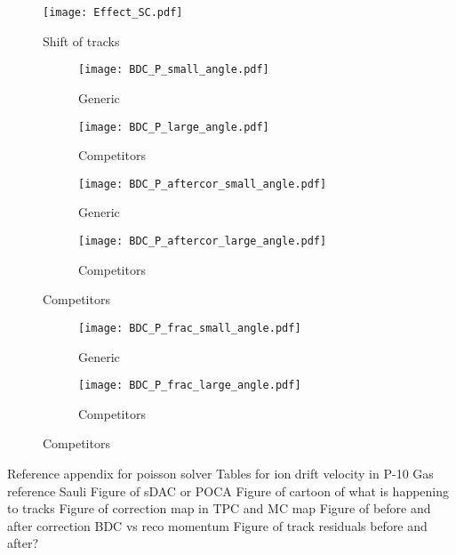 \begin{figure}[H]
\texttt{[image: Effect\_SC.pdf]}
\caption{Shift of tracks}
\label{fig:sc_shift}
\end{figure}


\begin{figure}[!htb]
    \centering
    \begin{subfigure}[t]{0.45\textwidth}
        \centering
        \texttt{[image: BDC\_P\_small\_angle.pdf]} 
        \caption{Generic} \label{fig:mom_S_before}
    \end{subfigure}
    \hfill
    \begin{subfigure}[t]{0.45\textwidth}
        \centering
        \texttt{[image: BDC\_P\_large\_angle.pdf]} 
        \caption{Competitors} \label{fig:mom_L_before}
    \end{subfigure}
    
    \begin{subfigure}[t]{0.45\textwidth}
        \centering
        \texttt{[image: BDC\_P\_aftercor\_small\_angle.pdf]} 
        \caption{Generic} \label{fig:mom_S_after}
    \end{subfigure}
    \hfill
    \begin{subfigure}[t]{0.45\textwidth}
        \centering
        \texttt{[image: BDC\_P\_aftercor\_large\_angle.pdf]} 
        \caption{Competitors} \label{fig:mom_L_after}
    \end{subfigure}
\label{fig:mom_sc}
\end{figure}



\begin{figure}[!htb]
    \centering
    \begin{subfigure}[t]{0.49\textwidth}
        \centering
        \texttt{[image: BDC\_P\_frac\_small\_angle.pdf]} 
        \caption{Generic} \label{fig:mom_S_1D}
    \end{subfigure}
    \hfill
    \begin{subfigure}[t]{0.49\textwidth}
        \centering
        \texttt{[image: BDC\_P\_frac\_large\_angle.pdf]} 
        \caption{Competitors} \label{fig:mom_L_1D}
    \end{subfigure}
    
\label{fig:mom_1D}
\end{figure}



Reference appendix for poisson solver 
Tables for ion drift velocity in P-10 Gas reference Sauli
Figure of sDAC or POCA 
Figure of cartoon of what is happening to tracks
Figure of correction map in TPC and MC map 
Figure of before and after correction BDC vs reco momentum
Figure of track residuals before and after?


